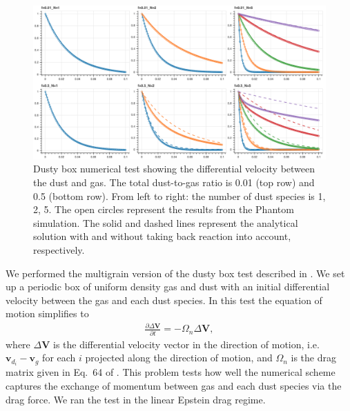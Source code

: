 \documentclass[fleqn,usenatbib]{mnras}
\let\vec\mathbf
\begin{document}
\begin{figure}
   \begin{center}
      \includegraphics[width=\textwidth]{figs/dustybox.png}
      \caption{Dusty box numerical test showing the differential velocity
         between the dust and gas. The total dust-to-gas ratio is 0.01 (top row)
         and 0.5 (bottom row). From left to right: the number of dust species is
         1, 2, 5. The open circles represent the results from the Phantom
         simulation. The solid and dashed lines represent the analytical
         solution with and without taking back reaction into account,
         respectively.\label{fig:dustybox}}
   \end{center}
\end{figure}

We performed the multigrain version of the dusty box test described in
\citet{Laibe2011MNRAS.418.1491L}. We set up a periodic box of uniform density
gas and dust with an initial differential velocity between the gas and each dust
species. In this test the equation of motion simplifies to
%
\begin{align}
   \frac{\partial \Delta \vec{V}}{\partial t} = - \Omega_n \Delta \vec{V},
\end{align}
%
where \(\Delta \vec{V}\) is the differential velocity vector in the direction of
motion, i.e. \(\vec{v}_{d_i} - \vec{v}_g\) for each \(i\) projected along the
direction of motion, and \(\Omega_n\) is the drag matrix given in Eq.~64 of
\citet{Laibe2014MNRAS.444.1940L}. This problem tests how well the numerical
scheme captures the exchange of momentum between gas and each dust species via
the drag force. We ran the test in the linear Epstein drag regime.
\end{document}
